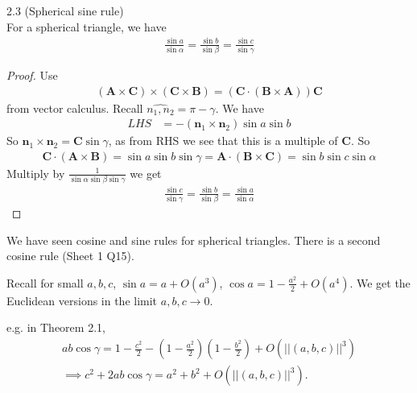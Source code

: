 \documentclass[a4paper]{article}
\begin{document}
\begin{thm} 2.3 (Spherical sine rule) \label{th2.3}\\
For a spherical triangle, we have
\begin{equation*}
\begin{aligned}
\frac{\sin a}{\sin \alpha} = \frac{\sin b}{\sin \beta} = \frac{\sin c}{\sin \gamma}
\end{aligned}
\end{equation*}
\begin{proof}
Use
\begin{equation*}
\begin{aligned}
(\mathbf{A} \times \mathbf{C} ) \times (\mathbf{C} \times \mathbf{B}) = (\mathbf{C} \cdot (\mathbf{B} \times \mathbf{A})) \mathbf{C}
\end{aligned}
\end{equation*}
from vector calculus. Recall $\widehat{n_1,n_2} = \pi - \gamma$. We have
\begin{equation*}
\begin{aligned}
LHS &= -(\mathbf{n}_1 \times \mathbf{n}_2) \sin a \sin b
\end{aligned}
\end{equation*}
So $\mathbf{n}_1 \times \mathbf{n}_2 = \mathbf{C} \sin \gamma$, as from RHS we see that this is a multiple of $\mathbf{C}$. So
\begin{equation*}
\begin{aligned}
\mathbf{C} \cdot (\mathbf{A} \times \mathbf{B}) = \sin a \sin b \sin \gamma = \mathbf{A} \cdot (\mathbf{B} \times \mathbf{C}) = \sin b \sin c \sin \alpha
\end{aligned}
\end{equation*}
Multiply by $\frac{1}{\sin \alpha \sin \beta \sin \gamma}$ we get
\begin{equation*}
\begin{aligned}
\frac{\sin c}{\sin \gamma} = \frac{\sin b}{\sin \beta} = \frac{\sin a}{\sin \alpha}
\end{aligned}
\end{equation*}
\end{proof}
\end{thm}

We have seen cosine and sine rules for spherical triangles. There is a second cosine rule (Sheet 1 Q15).

\begin{rem}
Recall for small $a,b,c$, $\sin a = a + O(a^3)$, $\cos a = 1-\frac{a^2}{2} + O(a^4)$. We get the Euclidean versions in the limit $a,b,c \to 0$.

e.g. in Theorem 2.1,
\begin{equation*}
\begin{aligned}
ab\cos \gamma = 1-\frac{c^2}{2} - \left(1-\frac{a^2}{2}\right)\left(1-\frac{b^2}{2}\right) + O(||(a,b,c)||^3)\\
\implies c^2+2ab\cos\gamma = a^2+b^2+O(||(a,b,c)||^3).
\end{aligned}
\end{equation*}
\end{rem}
\end{document}
